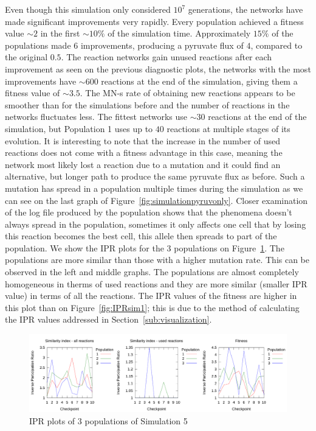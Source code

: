 \documentclass[a4paper,12pt]{article}
\begin{document}
Even though this simulation only considered $10^7$ generations, the networks have made significant improvements very rapidly. Every population achieved a fitness value $\sim 2$ in the first $\sim 10\%$ of the simulation time. Approximately $15\%$ of the populations made $6$ improvements, producing a pyruvate flux of $4$, compared to the original $0.5$. The reaction networks gain unused reactions after each improvement as seen on the previous diagnostic plots, the networks with the most improvements have $\sim 600$ reactions at the end of the simulation, giving them a fitness value of $\sim 3.5$. The MN-s rate of obtaining new reactions appears to be smoother than for the simulations before and the number of reactions in the networks fluctuates less. The fittest networks use $\sim 30$ reactions at the end of the simulation, but Population 1 uses up to $40$ reactions at multiple stages of its evolution. It is interesting to note that the increase in the number of used reactions does not come with a fitness advantage in this case, meaning the network most likely lost a reaction due to a mutation and it could find an alternative, but longer path to produce the same pyruvate flux as before. Such a mutation has spread in a population multiple times during the simulation as we can see on the last graph of Figure~\ref{fig:simulationpyruvonly}. Closer examination of the log file produced by the population shows that the phenomena doesn't always spread in the population, sometimes it only affects one cell that by losing this reaction becomes the best cell, this allele then spreads to part of the population. We show the IPR plots for the $3$ populations on Figure~\ref{fig:iprsim5}. The populations are more similar than those with a higher mutation rate. This can be observed in the left and middle graphs. The populations are almost completely homogeneous in therms of used reactions and they are more similar (smaller IPR value) in terms of all the reactions. The IPR values of the fitness are higher in this plot than on Figure~\ref{fig:IPRsim1}; this is due to the method of calculating the IPR values addressed in Section~\ref{sub:visualization}. 

\begin{figure}[htpb]
	\centering
	\includegraphics[width=1\linewidth]{iprsim5.pdf}
	\caption{IPR plots of 3 populations of Simulation 5}
	\label{fig:iprsim5}
\end{figure}
\end{document}

